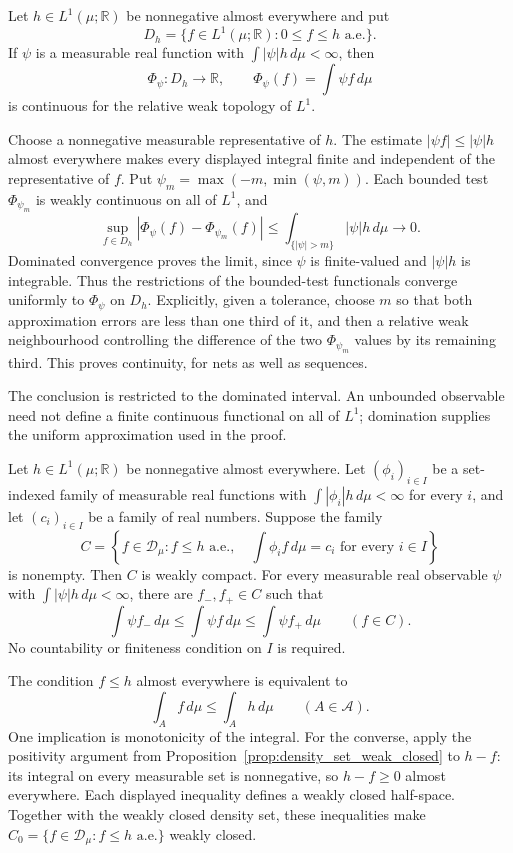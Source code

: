 \begin{lemma}
\label{lem:dominated_observable_continuity}
Let $h\in L^1(\mu;\mathbb R)$ be nonnegative almost everywhere and put
\[
D_h=\{f\in L^1(\mu;\mathbb R):0\leq f\leq h\text{ a.e.}\}.
\]
If $\psi$ is a measurable real function with
$\int|\psi|h\,d\mu<\infty$, then
\[
\Phi_\psi:D_h\longrightarrow\mathbb R,\qquad
\Phi_\psi(f)=\int\psi f\,d\mu
\]
is continuous for the relative weak topology of $L^1$.
\end{lemma}
\Proof
Choose a nonnegative measurable representative of $h$. The estimate
$|\psi f|\leq|\psi|h$ almost everywhere makes every displayed integral
finite and independent of the representative of $f$. Put
$\psi_m=\max(-m,\min(\psi,m))$. Each bounded test
$\Phi_{\psi_m}$ is weakly continuous on all of $L^1$, and
\[
\sup_{f\in D_h}|\Phi_\psi(f)-\Phi_{\psi_m}(f)|
\leq\int_{\{|\psi|>m\}}|\psi|h\,d\mu\longrightarrow0.
\]
Dominated convergence proves the limit, since $\psi$ is finite-valued
and $|\psi|h$ is integrable. Thus the restrictions of the bounded-test
functionals converge uniformly to $\Phi_\psi$ on $D_h$. Explicitly,
given a tolerance, choose $m$ so that both approximation errors are
less than one third of it, and then a relative weak neighbourhood
controlling the difference of the two $\Phi_{\psi_m}$ values by its
remaining third. This proves continuity, for nets as well as sequences.
\Done

The conclusion is restricted to the dominated interval. An unbounded
observable need not define a finite continuous functional on all of
$L^1$; domination supplies the uniform approximation used in the proof.

\begin{theorem}
\label{thm:attained_density_expectations}
Let $h\in L^1(\mu;\mathbb R)$ be nonnegative almost everywhere.
Let $(\phi_i)_{i\in I}$ be a set-indexed family of measurable real
functions with $\int|\phi_i|h\,d\mu<\infty$ for every $i$, and let
$(c_i)_{i\in I}$ be a family of real numbers. Suppose the family
\[
C=\left\{f\in\mathcal D_\mu:
 f\leq h\text{ a.e.},\quad
 \int\phi_i f\,d\mu=c_i\text{ for every }i\in I\right\}
\]
is nonempty. Then $C$ is weakly compact. For every measurable real
observable $\psi$ with $\int|\psi|h\,d\mu<\infty$, there are
$f_-,f_+\in C$ such that
\[
\int\psi f_-\,d\mu
 \leq\int\psi f\,d\mu
 \leq\int\psi f_+\,d\mu\qquad(f\in C).
\]
No countability or finiteness condition on $I$ is required.
\end{theorem}
\Proof
The condition $f\leq h$ almost everywhere is equivalent to
\[
\int_A f\,d\mu\leq\int_A h\,d\mu\qquad(A\in\mathcal A).
\]
One implication is monotonicity of the integral. For the converse,
apply the positivity argument from Proposition~\ref{prop:density_set_weak_closed}
to $h-f$: its integral on every measurable set is nonnegative, so
$h-f\geq0$ almost everywhere. Each displayed inequality defines a
weakly closed half-space. Together with the weakly closed density set,
these inequalities make
$C_0=\{f\in\mathcal D_\mu:f\leq h\text{ a.e.}\}$ weakly closed.

